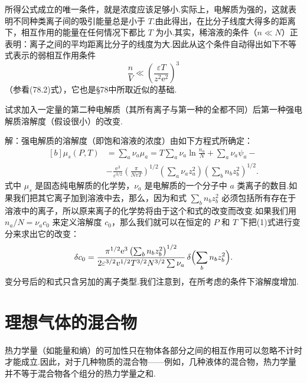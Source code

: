 所得公式成立的唯一条件，就是浓度应该足够小.实际上，电解质为强的，这就表明不同种类离子间的吸引能量总是小于 $T$.由此得出，在比分子线度大得多的距离下，相互作用的能量在任何情况下都比 $T$ 为小.其实，稀溶液的条件（$n\ll N$）正表明：离子之间的平均距离比分子的线度为大.因此从这个条件自动得出如下不等式表示的弱相互作用条件
\begin{equation*}
  \frac{n}{V}\ll\left(\frac{\varepsilon T}{z^2\mathrm{e}^2}\right)^3
\end{equation*}
（参看(78.2)式），它也是§78中所取近似的基础.

\begin{xiti}

\quad 试求加入一定量的第二种电解质（其所有离子与第一种的全都不同）后第一种强电解质溶解度（假设很小）的改变.

解：强电解质的溶解度（即饱和溶液的浓度）由如下方程式所确定：
\begin{equation*}
\begin{aligned}[b]
  \mu_s(P,T)&=\sum_a\nu_a\mu_a
  =T\sum_a\nu_a\ln\frac{n_a}{N}+\sum_a\nu_a\psi_a-\\
  &-\frac{\mathrm{e}^3}{\varepsilon^{3/2}}\left(\frac{\pi}{NvT}\right)^{1/2}
  \left(\sum_a\nu_az_a^2\right)\left(\sum_bn_bz_b^2\right)^{1/2}.
\end{aligned}
\end{equation*}
式中 $\mu_s$ 是固态纯电解质的化学势，$\nu_a$ 是电解质的一个分子中 $a$ 类离子的数目.如果我们把其它离子加到溶液中去，那么，因为和式 $\sum\limits_bn_bz_b^2$ 必须包括所有存在于溶液中的离子，所以原来离子的化学势将由于这个和式的改变而改变.如果我们用 $n_a/N=\nu_ac_0$ 来定义溶解度 $c_0$，那么我们就可以在恒定的 $P$ 和 $T$ 下把(1)式进行变分来求出它的改变：
\begin{equation*}
  \delta c_0=\frac{\pi^{1/2}\mathrm{e}^3
  \left(\sum_bn_bz_b^2\right)^{1/2}}
  {2\varepsilon^{3/2}v^{1/2}T^{3/2}N^{3/2}\sum\nu_a}
  \,\delta\Bigl(\sum_bn_bz_b^2\Bigr).
\end{equation*}
变分号后的和式只含另加的离子类型.我们注意到，在所考虑的条件下溶解度增加.

\end{xiti}

\section{理想气体的混合物}

热力学量（如能量和熵）的可加性只在物体各部分之间的相互作用可以忽略不计时才能成立.因此，对于几种物质的混合物——例如，几种液体的混合物，热力学量并不等于混合物各个组分的热力学量之和.

